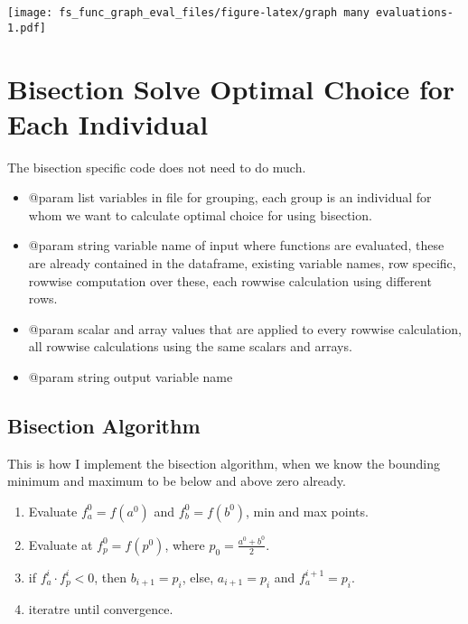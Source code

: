 \documentclass[]{article}
\providecommand{\tightlist}{%
  \setlength{\itemsep}{0pt}\setlength{\parskip}{0pt}}
\begin{document}
\texttt{[image: fs\_func\_graph\_eval\_files/figure-latex/graph many evaluations-1.pdf]}

\hypertarget{bisection-solve-optimal-choice-for-each-individual}{%
\section{Bisection Solve Optimal Choice for Each
Individual}\label{bisection-solve-optimal-choice-for-each-individual}}

The bisection specific code does not need to do much.

\begin{itemize}
\tightlist
\item
  @param list variables in file for grouping, each group is an
  individual for whom we want to calculate optimal choice for using
  bisection.
\item
  @param string variable name of input where functions are evaluated,
  these are already contained in the dataframe, existing variable names,
  row specific, rowwise computation over these, each rowwise calculation
  using different rows.
\item
  @param scalar and array values that are applied to every rowwise
  calculation, all rowwise calculations using the same scalars and
  arrays.
\item
  @param string output variable name
\end{itemize}

\hypertarget{bisection-algorithm}{%
\subsection{Bisection Algorithm}\label{bisection-algorithm}}

This is how I implement the bisection algorithm, when we know the
bounding minimum and maximum to be below and above zero already.

\begin{enumerate}
\def\labelenumi{\arabic{enumi}.}
\tightlist
\item
  Evaluate \(f^0_a = f(a^0)\) and \(f^0_b = f(b^0)\), min and max
  points.
\item
  Evaluate at \(f^0_p = f(p^0)\), where \(p_0 = \frac{a^0+b^0}{2}\).
\item
  if \(f^i_a \cdot f^i_p < 0\), then \(b_{i+1} = p_i\), else,
  \(a_{i+1} = p_i\) and \(f^{i+1}_a = p_i\).
\item
  iteratre until convergence.
\end{enumerate}
\end{document}
